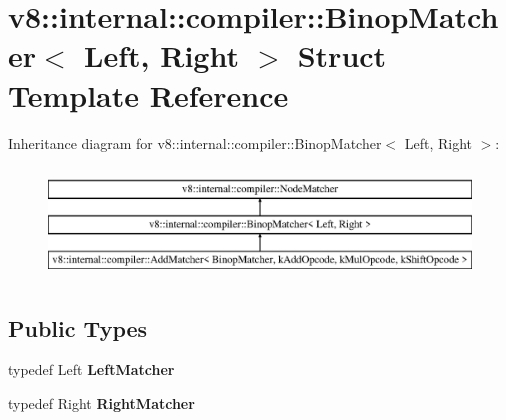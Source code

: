 \hypertarget{structv8_1_1internal_1_1compiler_1_1_binop_matcher}{}\section{v8\+:\+:internal\+:\+:compiler\+:\+:Binop\+Matcher$<$ Left, Right $>$ Struct Template Reference}
\label{structv8_1_1internal_1_1compiler_1_1_binop_matcher}
Inheritance diagram for v8\+:\+:internal\+:\+:compiler\+:\+:Binop\+Matcher$<$ Left, Right $>$\+:\begin{figure}[H]
\begin{center}
\leavevmode
\includegraphics[height=2.978723cm]{structv8_1_1internal_1_1compiler_1_1_binop_matcher}
\end{center}
\end{figure}
\subsection*{Public Types}
\begin{DoxyCompactItemize}
\item 
typedef Left {\bfseries Left\+Matcher}\hypertarget{structv8_1_1internal_1_1compiler_1_1_binop_matcher_add15be1cbb9d86c593ca83b8a90471df}{}\label{structv8_1_1internal_1_1compiler_1_1_binop_matcher_add15be1cbb9d86c593ca83b8a90471df}

\item 
typedef Right {\bfseries Right\+Matcher}\hypertarget{structv8_1_1internal_1_1compiler_1_1_binop_matcher_a00090d100f19cb85a335326658159523}{}\label{structv8_1_1internal_1_1compiler_1_1_binop_matcher_a00090d100f19cb85a335326658159523}

\end{DoxyCompactItemize}
